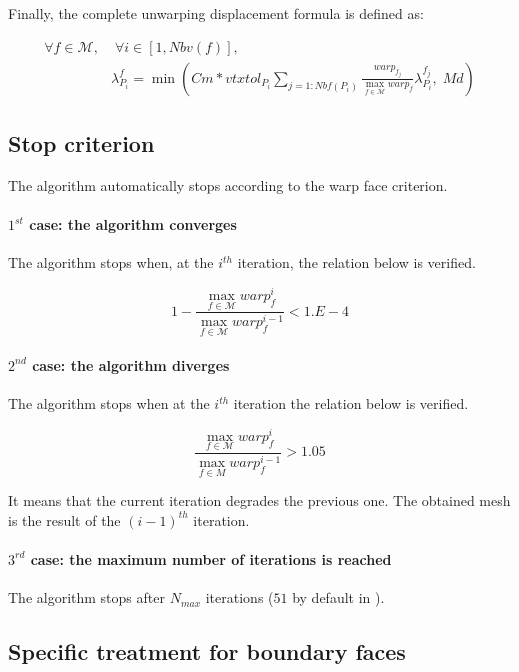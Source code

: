 Finally, the complete unwarping displacement formula is defined as:

\begin{equation*}
\begin{split}
\forall f \in \mathcal{M},& \; \forall i \in [1,Nbv(f)], \qquad \\
&\lambda_{P_{i}}^{f}=\min(Cm*vtxtol_{P_{i}}\sum_{j=1:Nbf(P_{i})}
\frac{warp_{f_{j}}}{\max_{f \in \mathcal{M}}
warp_{f}}\lambda^{f_{j}}_{P_{i}},\; Md)
\end{split}
\end{equation*}


\subsection*{Stop criterion\label{sec:unwarping_stop}}
The algorithm automatically stops according to the warp face criterion.

\paragraph*{$1^{st}$ case: the algorithm converges}
The algorithm stops when, at the $i^{th}$ iteration, the relation below is verified.

$$ 1 - \frac{\max_{f\in \mathcal{M}} warp_{f}^{i}}{\max_{f\in \mathcal{M}}
warp_{f}^{i-1}} < 1.E-4$$

\paragraph*{$2^{nd}$ case: the algorithm diverges}

The algorithm stops when at the $i^{th}$ iteration the relation below is verified.

$$\frac{\max_{f\in \mathcal{M}} warp_{f}^{i}}{\max_{f\in M}
warp_{f}^{i-1}} > 1.05$$

It means that the current iteration degrades the previous one.
The obtained mesh is the result of the $(i-1)^{th}$ iteration.

\paragraph*{$3^{rd}$ case: the maximum number of iterations is reached}
The algorithm stops after $N_{max}$ iterations ($51$ by default in \CS).

\subsection*{Specific treatment for boundary faces
\label{sec:unwarping_boundary}}

